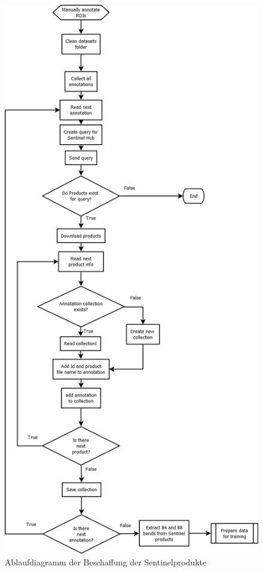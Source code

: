 \begin{figure}[ht]
  \centering
  \includegraphics[height=\textheight-31pt]{pics/get-products.png}
  \caption{Ablaufdiagramm der Beschaffung der Sentinelprodukte}
  \label{fig:get-products}
\end{figure}

